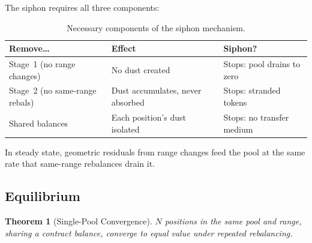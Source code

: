 \documentclass[11pt,a4paper]{article}
\newtheorem{theorem}{Theorem}
\begin{document}
The siphon requires all three components:

\begin{table}[H]
\centering
\caption{Necessary components of the siphon mechanism.}\label{tab:siphon-components}
\begin{tabular}{@{}lll@{}}
\toprule
Remove\ldots & Effect & Siphon? \\
\midrule
Stage~1 (no range changes) & No dust created & Stops: pool drains to zero \\
Stage~2 (no same-range rebals) & Dust accumulates, never absorbed & Stops: stranded tokens \\
Shared balances & Each position's dust isolated & Stops: no transfer medium \\
\bottomrule
\end{tabular}
\end{table}

In steady state, geometric residuals from range changes feed the pool at the same rate that same-range rebalances drain it.

\subsection{Equilibrium}\label{sec:equilibrium}

\begin{theorem}[Single-Pool Convergence]\label{thm:convergence}
$N$ positions in the same pool and range, sharing a contract balance, converge to equal value under repeated rebalancing.
\end{theorem}
\end{document}
